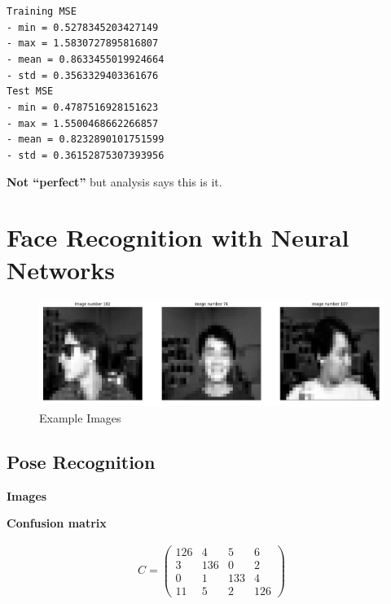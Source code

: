 \documentclass[12pt,a4paper]{article}
\begin{document}
\begin{enumerate}[a)]
\texttt{Training MSE \\
- min = 0.5278345203427149 \\
- max = 1.5830727895816807 \\
- mean = 0.8633455019924664 \\
- std = 0.3563329403361676\\
Test MSE \\
- min = 0.4787516928151623 \\
- max = 1.5500468662266857 \\
- mean = 0.8232890101751599 \\
- std = 0.36152875307393956\\
}

\textbf{Not ``perfect''} but analysis says this is it.

\end{enumerate}

\section{Face Recognition with Neural Networks}

\begin{figure}[H]
	\centering
  \includegraphics[width=\textwidth]{figures/2_images.png}
	\caption{Example Images}
	\label{2_images}
\end{figure}

\subsection{Pose Recognition}

\textbf{Images}

\textbf{Confusion matrix\autocite{wiki:cm}}

\begin{align*}C =
\begin{pmatrix}
126 & 4 & 5 & 6 \\
3 & 136 & 0 & 2 \\
0 & 1 & 133 & 4 \\
11 & 5 & 2 & 126
\end{pmatrix}
\end{align*}
\end{document}
